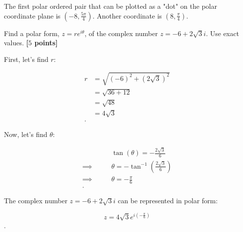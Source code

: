 \begin{solution}
  The first polar ordered pair that can be plotted as a "dot" on the polar
  coordinate plane is $(-8, \frac{5\pi}{4})$. Another coordinate is $(8,
  \frac{\pi}{4})$.
\end{solution}

\newpage

\begin{problem}
  Find a polar form, $z = re^{i\theta}$, of the complex number $z = -6 +
  2\sqrt{3}i$. Use exact values. \textbf{[$5$ points]}
\end{problem}

\begin{solution}
  First, let's find $r$:

  \begin{align*}
    r &= \sqrt{(-6)^{2} + (2\sqrt{3})^{2}} \\
      &= \sqrt{36 + 12} \\
      &= \sqrt{48} \\
      &= 4\sqrt{3} \\
  .\end{align*}

  Now, let's find $\theta$:

  \begin{align*}
    \qquad&\tan (\theta) = -\frac{2\sqrt{3}}{6} \\
    \implies\qquad&\theta = -\tan^{-1} (\frac{2\sqrt{3}}{6}) \\
    \implies\qquad&\theta = -\frac{\pi}{6} \\
  .\end{align*}

  The complex number $z = -6 + 2\sqrt{3}i$ can be represented in polar form:

  \[ z = 4\sqrt{3}e^{i\left(-\frac{\pi}{6}\right)} \].
\end{solution}
